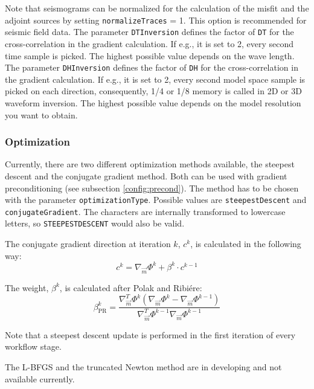 \documentclass[pdftex,a4paper,parskip,listof=totoc,bibliography=totoc,onehalfspacing,12pt]{scrreprt}
\begin{document}
Note that seismograms can be normalized for the calculation of the misfit and the adjoint sources by setting \verb+normalizeTraces+ = 1. This option is recommended for seismic field data.
The parameter \verb+DTInversion+ defines the factor of \verb+DT+ for the cross-correlation in the gradient calculation. If e.g., it is set to 2, every second time sample is picked. The highest possible value depends on the wave length.
The parameter \verb+DHInversion+ defines the factor of \verb+DH+ for the cross-correlation in the gradient calculation. If e.g., it is set to 2, every second model space sample is picked on each direction, consequently, 1/4 or 1/8 memory is called in 2D or 3D waveform inversion. The highest possible value depends on the model resolution you want to obtain.

\subsubsection{Optimization}
Currently, there are two different optimization methods available, the steepest descent and the conjugate gradient method. Both can be used with gradient preconditioning (see subsection \ref{config:precond}). The method has to be chosen with the parameter \verb+optimizationType+. Possible values are \verb+steepestDescent+ and \verb+conjugateGradient+. The characters are internally transformed to lowercase letters, so \verb+STEEPESTDESCENT+ would also be valid.

The conjugate gradient direction at iteration $k$, $c^k$, is calculated in the following way:
\begin{equation*}
 c^k =  \nabla_{\vec{m}} \Phi^k + \beta^k \cdot c^{k-1}
\end{equation*}

The weight, $\beta^k$, is calculated after Polak and Ribi\'{e}re:
\begin{equation*}
 \beta^k_{\mathrm{PR}} = \frac{ \nabla_{\vec{m}}^T \Phi^k (\nabla_{\vec{m}} \Phi^k - \nabla_{\vec{m}} \Phi^{k-1}) }{\nabla_{\vec{m}}^T \Phi^{k-1} \nabla_{\vec{m}} \Phi^{k-1}}
\end{equation*}

Note that a steepest descent update is performed in the first iteration of every workflow stage.

The L-BFGS and the truncated Newton method are in developing and not available currently.
\end{document}
